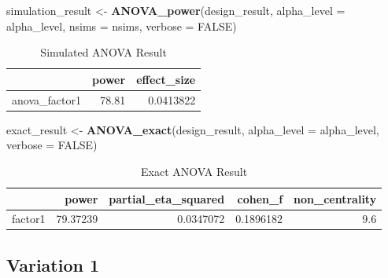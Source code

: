 \documentclass[
]{book}
\newenvironment{Shaded}{\begin{snugshade}}{\end{snugshade}}
\newcommand{\DataTypeTok}[1]{\textcolor[rgb]{0.13,0.29,0.53}{#1}}
\newcommand{\KeywordTok}[1]{\textcolor[rgb]{0.13,0.29,0.53}{\textbf{#1}}}
\newcommand{\NormalTok}[1]{#1}
\newcommand{\OtherTok}[1]{\textcolor[rgb]{0.56,0.35,0.01}{#1}}
\newcommand{\StringTok}[1]{\textcolor[rgb]{0.31,0.60,0.02}{#1}}
\begin{document}
\begin{Shaded}
\begin{Highlighting}[]
\NormalTok{simulation_result <-}\StringTok{ }\KeywordTok{ANOVA_power}\NormalTok{(design_result, }
                                 \DataTypeTok{alpha_level =}\NormalTok{ alpha_level, }
                                 \DataTypeTok{nsims =}\NormalTok{ nsims,}
                                 \DataTypeTok{verbose =} \OtherTok{FALSE}\NormalTok{)}
\end{Highlighting}
\end{Shaded}

\begin{table}[!h]

\caption{\label{tab:unnamed-chunk-312}Simulated ANOVA Result}
\centering
\begin{tabular}[t]{l|r|r}
\hline
  & power & effect\_size\\
\hline
anova\_factor1 & 78.81 & 0.0413822\\
\hline
\end{tabular}
\end{table}

\begin{Shaded}
\begin{Highlighting}[]
\NormalTok{exact_result <-}\StringTok{ }\KeywordTok{ANOVA_exact}\NormalTok{(design_result,}
                            \DataTypeTok{alpha_level =}\NormalTok{ alpha_level,}
                            \DataTypeTok{verbose =} \OtherTok{FALSE}\NormalTok{)}
\end{Highlighting}
\end{Shaded}

\begin{table}[!h]

\caption{\label{tab:unnamed-chunk-314}Exact ANOVA Result}
\centering
\begin{tabular}[t]{l|r|r|r|r}
\hline
  & power & partial\_eta\_squared & cohen\_f & non\_centrality\\
\hline
factor1 & 79.37239 & 0.0347072 & 0.1896182 & 9.6\\
\hline
\end{tabular}
\end{table}

\hypertarget{variation-1}{%
\subsection{Variation 1}\label{variation-1}}
\end{document}
